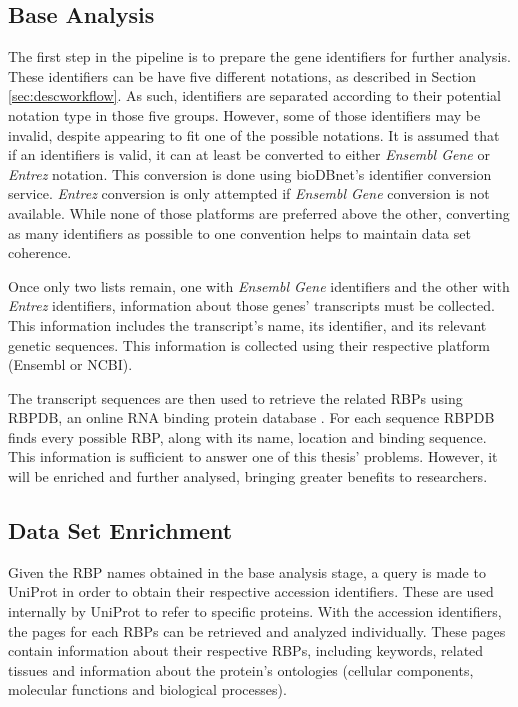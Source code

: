 \subsection{Base Analysis}

The first step in the pipeline is to prepare the gene identifiers for further
analysis. These identifiers can be have five different notations, as described
in Section \ref{sec:descworkflow}. As such, identifiers are separated according
to their potential notation type in those five groups. However, some of those
identifiers may be invalid, despite appearing to fit one of the possible
notations. It is assumed that if an identifiers is valid, it can at least be
converted to either \emph{Ensembl Gene} or \emph{Entrez} notation. This
conversion is done using bioDBnet's \cite{Mudunuri15022009} identifier
conversion service. \emph{Entrez} conversion is only attempted if \emph{Ensembl
Gene} conversion is not available. While none of those platforms are preferred
above the other, converting as many identifiers as possible to one convention
helps to maintain data set coherence.

Once only two lists remain, one with \emph{Ensembl Gene} identifiers and the
other with \emph{Entrez} identifiers, information about those genes' transcripts
must be collected. This information includes the transcript's name, its
identifier, and its relevant genetic sequences. This information is collected
using their respective platform (Ensembl or NCBI).

The transcript sequences are then used to retrieve the related RBPs using RBPDB,
an online RNA binding protein database \cite{Cook01012011}. For each sequence
RBPDB finds every possible RBP, along with its name, location and binding
sequence. This information is sufficient to answer one of this thesis' problems.
However, it will be enriched and further analysed, bringing greater benefits to
researchers.

\subsection{Data Set Enrichment}

Given the RBP names obtained in the base analysis stage, a query is made to
UniProt in order to obtain their respective accession identifiers. These are
used internally by UniProt to refer to specific proteins. With the accession
identifiers, the pages for each RBPs can be retrieved and analyzed individually.
These pages contain information about their respective RBPs, including keywords,
related tissues and information about the protein's ontologies (cellular
components, molecular functions and biological processes).

